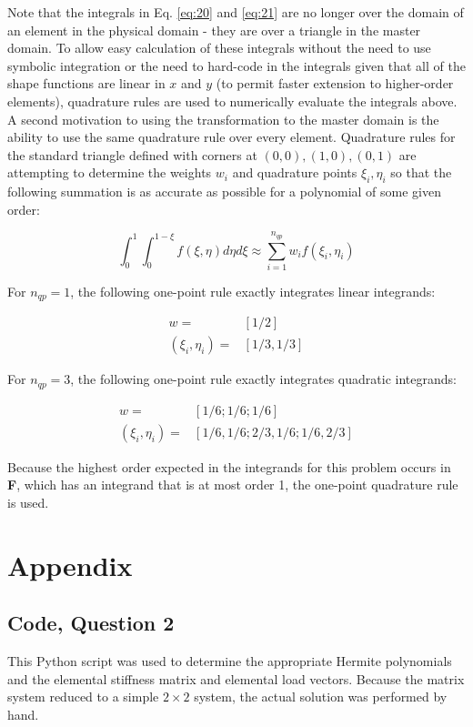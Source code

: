 \documentclass[10pt]{article}
\newcommand{\beq}{\begin{equation}}
\newcommand{\eeq}{\end{equation}}
\newcommand{\beqa}{\begin{equation}\begin{aligned}}
\newcommand{\eeqa}{\end{aligned}\end{equation}}
\begin{document}
Note that the integrals in Eq. \eqref{eq:20} and \eqref{eq:21} are no longer over the domain of an element in the physical domain - they are over a triangle in the master domain. To allow easy calculation of these integrals without the need to use symbolic integration or the need to hard-code in the integrals given that all of the shape functions are linear in \(x\) and \(y\) (to permit faster extension to higher-order elements), quadrature rules are used to numerically evaluate the integrals above. A second motivation to using the transformation to the master domain is the ability to use the same quadrature rule over every element. Quadrature rules for the standard triangle defined with corners at \((0,0), (1,0), (0,1)\) are attempting to determine the weights \(w_i\) and quadrature points \(\xi_i,\eta_i\) so that the following summation is as accurate as possible for a polynomial of some given order:

\beq
\int_{0}^{1} \int_{0}^{1-\xi}f(\xi,\eta)d\eta d\xi\approx\sum_{i=1}^{n_{qp}}w_if(\xi_i,\eta_i)
\eeq

For \(n_{qp}=1\), the following one-point rule exactly integrates linear integrands:

\beqa
w=&[1/2]\\
(\xi_i,\eta_i)=&[1/3, 1/3]
\eeqa

For \(n_{qp}=3\), the following one-point rule exactly integrates quadratic integrands:

\beqa
w=&[1/6; 1/6; 1/6]\\
(\xi_i,\eta_i)=&[1/6, 1/6; 2/3, 1/6; 1/6, 2/3]
\eeqa

Because the highest order expected in the integrands for this problem occurs in \textbf{F}, which has an integrand that is at most order 1, the one-point quadrature rule is used. 



\section{Appendix}

\subsection{Code, Question 2}

This Python script was used to determine the appropriate Hermite polynomials and the elemental stiffness matrix and elemental load vectors. Because the matrix system reduced to a simple \(2\times 2\) system, the actual solution was performed by hand.


\end{document}
